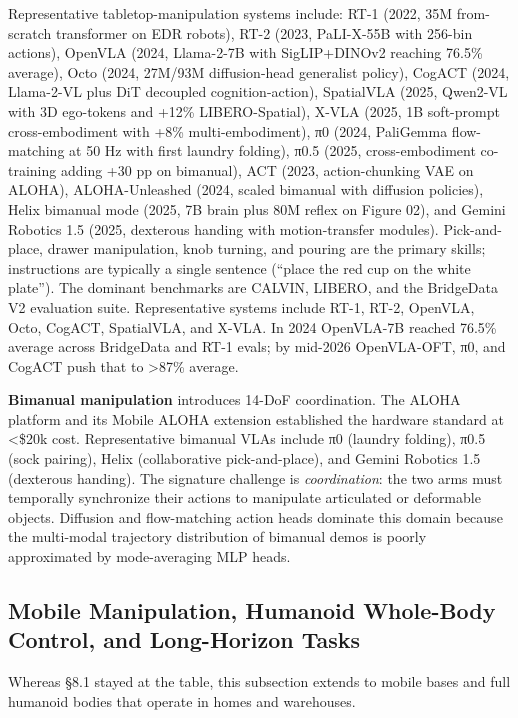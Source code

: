 \documentclass{article}
\begin{document}
Representative tabletop-manipulation systems include: RT-1 (2022, 35M from-scratch transformer on EDR robots), RT-2 (2023, PaLI-X-55B with 256-bin actions), OpenVLA (2024, Llama-2-7B with SigLIP+DINOv2 reaching 76.5\% average), Octo (2024, 27M/93M diffusion-head generalist policy), CogACT (2024, Llama-2-VL plus DiT decoupled cognition-action), SpatialVLA (2025, Qwen2-VL with 3D ego-tokens and +12\% LIBERO-Spatial), X-VLA (2025, 1B soft-prompt cross-embodiment with +8\% multi-embodiment), π0 (2024, PaliGemma flow-matching at 50 Hz with first laundry folding), π0.5 (2025, cross-embodiment co-training adding +30 pp on bimanual), ACT (2023, action-chunking VAE on ALOHA), ALOHA-Unleashed (2024, scaled bimanual with diffusion policies), Helix bimanual mode (2025, 7B brain plus 80M reflex on Figure 02), and Gemini Robotics 1.5 (2025, dexterous handing with motion-transfer modules). Pick-and-place, drawer manipulation, knob turning, and pouring are the primary skills; instructions are typically a single sentence (``place the red cup on the white plate''). The dominant benchmarks are CALVIN, LIBERO, and the BridgeData V2 evaluation suite. Representative systems include RT-1, RT-2, OpenVLA, Octo, CogACT, SpatialVLA, and X-VLA. In 2024 OpenVLA-7B reached 76.5\% average across BridgeData and RT-1 evals; by mid-2026 OpenVLA-OFT, π0, and CogACT push that to \textgreater87\% average.

\textbf{Bimanual manipulation} introduces 14-DoF coordination. The ALOHA platform \cite{zhao2023learningfinegraine} and its Mobile ALOHA extension \cite{fu2024mobilealohalearnin} established the hardware standard at \textless\$20k cost. Representative bimanual VLAs include π0 (laundry folding), π0.5 (sock pairing), Helix (collaborative pick-and-place), and Gemini Robotics 1.5 (dexterous handing). The signature challenge is \emph{coordination}: the two arms must temporally synchronize their actions to manipulate articulated or deformable objects. Diffusion and flow-matching action heads dominate this domain because the multi-modal trajectory distribution of bimanual demos is poorly approximated by mode-averaging MLP heads.

\subsection{Mobile Manipulation, Humanoid Whole-Body Control, and Long-Horizon Tasks}\label{mobile-manipulation-humanoid-whole-body-control-and-long-horizon-tasks}

Whereas §8.1 stayed at the table, this subsection extends to mobile bases and full humanoid bodies that operate in homes and warehouses.
\end{document}
